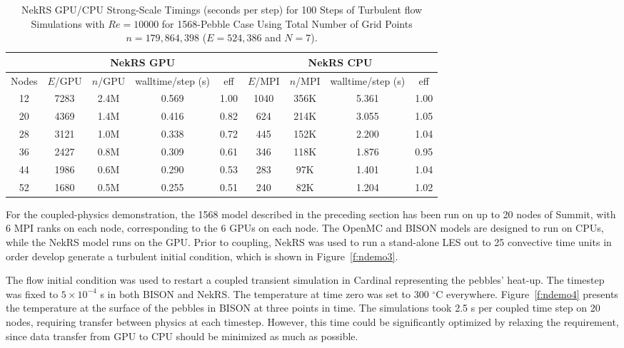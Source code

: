 \begin{table}
  \centering
  \begin{tabular}{c|cccc||cccc}
    \hline
  \multicolumn{1}{c|}{ } &
  \multicolumn{4}{|c||}{NekRS GPU}  &
  \multicolumn{4}{|c}{NekRS CPU} \\
  \hline
    Nodes  &  $E$/GPU & $n$/GPU & walltime/step (s) & eff & $E$/MPI& $n$/MPI & walltime/step (s) & eff\\
  \hline
    12 & 7283 & 2.4M & 0.569 & 1.00 & 1040 & 356K & 5.361  & 1.00\\
    20 & 4369 & 1.4M & 0.416 & 0.82 & 624 & 214K  & 3.055  & 1.05\\
    28 & 3121 & 1.0M & 0.338 & 0.72 & 445 & 152K & 2.200  & 1.04\\
    36 & 2427 & 0.8M & 0.309 & 0.61 & 346 & 118K & 1.876  & 0.95\\
    44 & 1986 & 0.6M & 0.290 & 0.53 & 283 & 97K & 1.401  & 1.04\\
    52 & 1680 & 0.5M & 0.255 & 0.51 & 240 & 82K & 1.204  & 1.02\\
    \hline \hline
  \end{tabular}
  \caption{NekRS GPU/CPU Strong-Scale Timings (seconds per step) for 100 Steps of Turbulent flow Simulations
   with $Re=10000$ for 1568-Pebble Case Using Total Number of Grid Points $n=179,864,398$ ($E=524,386$ and $N=7$).}
  \label{tab:nekrs}
\end{table}

For the coupled-physics demonstration, the 1568 model described in the preceding
section has been run on up to 20 nodes of Summit, with 6 MPI ranks on each
node, corresponding to the 6 GPUs on each node. The OpenMC and BISON models are
designed to run on CPUs, while the NekRS model runs on the GPU. Prior to
coupling, NekRS was used to run a stand-alone LES out to 25 convective time
units in order develop generate a turbulent initial condition, which is shown
in Figure~\ref{f:ndemo3}.

The flow initial condition was used to restart a coupled transient simulation in
Cardinal representing the pebbles' heat-up. The timestep was fixed to $5\times
10^{-4}$ s in both BISON and NekRS. The temperature at time zero was set to 300
$^{\circ}$C everywhere. Figure~\ref{f:ndemo4} presents the temperature at the
surface of the pebbles in BISON at three points in time. The simulations took
2.5 s per coupled time step on 20 nodes, requiring transfer between physics at
each timestep. However, this time could be significantly optimized by relaxing
the requirement, since data transfer from GPU to CPU should be minimized as
much as possible.

